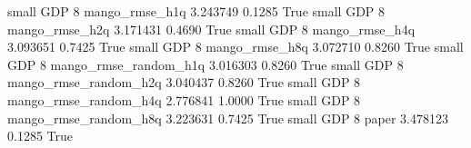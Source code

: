      small      GDP                 8        mango_rmse_h1q   3.243749      0.1285    True
     small      GDP                 8        mango_rmse_h2q   3.171431      0.4690    True
     small      GDP                 8        mango_rmse_h4q   3.093651      0.7425    True
     small      GDP                 8        mango_rmse_h8q   3.072710      0.8260    True
     small      GDP                 8 mango_rmse_random_h1q   3.016303      0.8260    True
     small      GDP                 8 mango_rmse_random_h2q   3.040437      0.8260    True
     small      GDP                 8 mango_rmse_random_h4q   2.776841      1.0000    True
     small      GDP                 8 mango_rmse_random_h8q   3.223631      0.7425    True
     small      GDP                 8                 paper   3.478123      0.1285    True